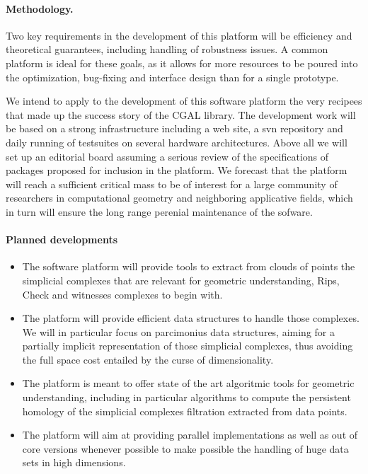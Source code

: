 \paragraph{ Methodology.} 
Two key requirements in the development of this platform will be
efficiency and theoretical guarantees, including handling of
robustness issues. A common
platform is ideal for these goals, as it allows for more
resources to be poured into the optimization, bug-fixing and interface
design than for a single prototype.

 We intend to apply to the development of this software platform 
the very  recipees that made up the success story
of the CGAL library. 
The development work will be based on a strong infrastructure
including a web site, a svn repository and  daily running of testsuites on several  hardware architectures.
Above all we will set up  an editorial board assuming a  serious review of the 
specifications of packages proposed for inclusion in the platform.
We forecast that the platform will reach a sufficient critical mass
to be of interest for a large community of researchers in
computational geometry and neighboring applicative fields,
which in turn will ensure the long range perenial maintenance
of the sofware.



\paragraph{Planned developments} 
\begin{itemize}
\item The software platform will provide tools to extract from clouds of points the
simplicial complexes that are relevant for geometric understanding,
Rips, Check and witnesses complexes to begin with. 
\item The platform will provide efficient data structures to handle those
complexes. We will in particular  focus on parcimonius data
structures, aiming for a partially implicit representation of those simplicial
complexes, thus avoiding the full space cost entailed by the curse of
dimensionality. 
\item The platform is meant to offer state of the art algoritmic tools for geometric
understanding,
including in particular algorithms to compute the persistent homology
of the simplicial complexes filtration extracted from data points. 
\item The platform will aim at providing parallel implementations as well
as out of core versions whenever possible to make possible the
handling of huge data sets in high dimensions.
\end{itemize}

